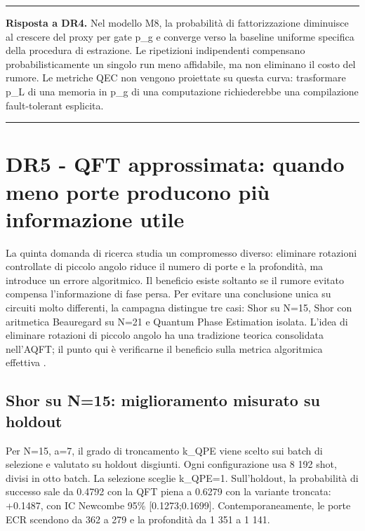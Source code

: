\par\medskip\noindent\rule{\linewidth}{0.6pt}\par\nopagebreak
{\small{}\noindent \textbf{Risposta a DR4.} Nel modello M8, la probabilità di fattorizzazione diminuisce al crescere del proxy per gate p\_g e converge verso la baseline uniforme specifica della procedura di estrazione. Le ripetizioni indipendenti compensano probabilisticamente un singolo run meno affidabile, ma non eliminano il costo del rumore. Le metriche QEC non vengono proiettate su questa curva: trasformare p\_L di una memoria in p\_g di una computazione richiederebbe una compilazione fault-tolerant esplicita.\par}
\nopagebreak\noindent\rule{\linewidth}{0.6pt}\par\medskip

\clearpage

\section{DR5 - QFT approssimata: quando meno porte producono più informazione utile}\label{sec:finale_5_5}\label{sec:qft_topologia}

La quinta domanda di ricerca studia un compromesso diverso: eliminare rotazioni controllate di piccolo angolo riduce il numero di porte e la profondità, ma introduce un errore algoritmico. Il beneficio esiste soltanto se il rumore evitato compensa l'informazione di fase persa. Per evitare una conclusione unica su circuiti molto differenti, la campagna distingue tre casi: Shor su N=15, Shor con aritmetica Beauregard su N=21 e Quantum Phase Estimation isolata. L'idea di eliminare rotazioni di piccolo angolo ha una tradizione teorica consolidata nell'AQFT; il punto qui è verificarne il beneficio sulla metrica algoritmica effettiva \cite{barencoAQFT1996,akoramurthy2026}.

\subsection{Shor su N=15: miglioramento misurato su holdout}\label{sec:finale_5_5_1}

Per N=15, a=7, il grado di troncamento k\_QPE viene scelto sui batch di selezione e valutato su holdout disgiunti. Ogni configurazione usa 8 192 shot, divisi in otto batch. La selezione sceglie k\_QPE=1. Sull'holdout, la probabilità di successo sale da 0.4792 con la QFT piena a 0.6279 con la variante troncata: +0.1487, con IC Newcombe 95\% {[}0.1273;0.1699{]}. Contemporaneamente, le porte ECR scendono da 362 a 279 e la profondità da 1 351 a 1 141.

